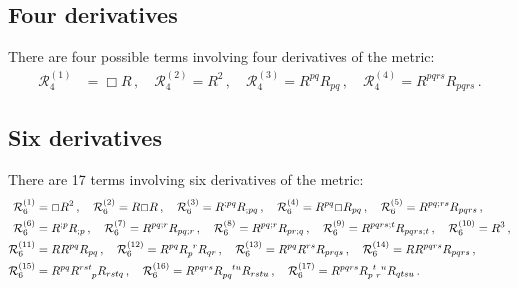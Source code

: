 \documentclass[11pt]{article}
\begin{document}
{\subsection{Four derivatives}
There are four possible terms involving four derivatives of the metric:
\begin{align}
\mathcal{R}_4^{(1)} &= \Box R \, , 
\quad 
\mathcal{R}_4^{(2)} = R^2 \, ,
\quad 
\mathcal{R}_4^{(3)} = R^{pq} R_{pq} \, ,
\quad
\mathcal{R}_4^{(4)} = R^{pqrs} R_{pqrs} \, .
\end{align}

\subsection{Six derivatives}
There are 17 terms involving six derivatives of the metric:
\begin{align}
\mathcal{R}_{6}^{(1)} &= \Box R^2 \, ,
\quad
\mathcal{R}_{6}^{(2)} = R \Box R \, ,
\quad
\mathcal{R}_{6}^{(3)} = R^{;pq} R_{;pq} \, ,
\quad 
\mathcal{R}_{6}^{(4)} = R^{pq} \Box R_{pq} \, ,
\quad 
\mathcal{R}_{6}^{(5)} = R^{pq;rs} R_{pqrs} \, ,
\nonumber\\
\mathcal{R}_{6}^{(6)} &= R^{;p} R_{;p} \, ,
\quad 
\mathcal{R}_{6}^{(7)} = R^{pq;r} R_{pq;r} \, ,
\quad
\mathcal{R}_{6}^{(8)} = R^{pq;r} R_{pr;q} \, ,
\quad 
\mathcal{R}_{6}^{(9)} = R^{pqrs;t} R_{pqrs;t} \, ,
\quad 
\mathcal{R}_{6}^{(10)} = R^3 \, ,
\nonumber\\
\mathcal{R}_{6}^{(11)} &= R R^{pq} R_{pq} \,,
\quad
\mathcal{R}_{6}^{(12)} = R^{pq} \tensor{R}{_p^r} R_{qr} \, ,
\quad 
\mathcal{R}_{6}^{(13)} = R^{pq} R^{rs} R_{prqs} \, ,
\quad
\mathcal{R}_{6}^{(14)} = R R^{pqrs} R_{pqrs} \, ,
\nonumber\\
\mathcal{R}_{6}^{(15)} &= R^{pq} \tensor{R}{^{rst}_p} R_{rstq} \, ,
\quad
\mathcal{R}_{6}^{(16)} = R^{pqrs} \tensor{R}{_{pq}^{tu}} R_{rstu} \, ,
\quad
\mathcal{R}_{6}^{(17)} = R^{pqrs} \tensor{R}{_p^t_r^u} R_{qtsu} \, .
\end{align}

}
\end{document}

